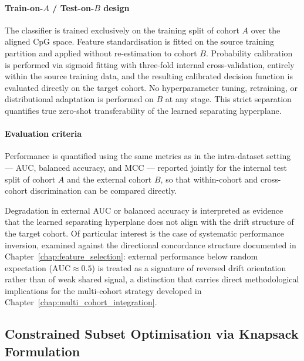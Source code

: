 \paragraph{Train-on-$A$ / Test-on-$B$ design}

The classifier is trained exclusively on the training split
of cohort $A$ over the aligned CpG space. Feature
standardisation is fitted on the source training partition
and applied without re-estimation to cohort $B$. Probability
calibration is performed via sigmoid fitting with three-fold
internal cross-validation, entirely within the source training
data, and the resulting calibrated decision function is
evaluated directly on the target cohort. No hyperparameter
tuning, retraining, or distributional adaptation is performed
on $B$ at any stage. This strict separation quantifies true
zero-shot transferability of the learned separating hyperplane.

\paragraph{Evaluation criteria}

Performance is quantified using the same metrics as in the
intra-dataset setting — AUC, balanced accuracy, and MCC —
reported jointly for the internal test split of cohort $A$ and
the external cohort $B$, so that within-cohort and
cross-cohort discrimination can be compared directly.

Degradation in external AUC or balanced accuracy is
interpreted as evidence that the learned separating hyperplane
does not align with the drift structure of the target cohort.
Of particular interest is the case of systematic performance
inversion, examined against the directional concordance
structure documented in Chapter~\ref{chap:feature_selection}:
external performance below random expectation
($\mathrm{AUC} \approx 0.5$) is treated as a signature of
reversed drift orientation rather than of weak shared signal,
a distinction that carries direct methodological implications
for the multi-cohort strategy developed in
Chapter~\ref{chap:multi_cohort_integration}.

\subsection{Constrained Subset Optimisation via Knapsack Formulation}
\label{sec:knapsack}

